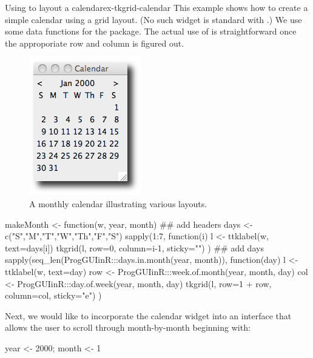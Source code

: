 \begin{example}{Using  to layout a calendar}{ex-tkgrid-calendar}
This example shows how to create a simple calendar using a grid
layout. (No such widget is standard with .) We use some
data functions for the  package. The actual use of
 is straightforward once the approporiate row and
column is figured out.




\begin{figure}
  \centering
  \includegraphics[width=.35\textwidth]{fig-tcltk-grid-calendar}
  \caption{A monthly calendar illustrating various layouts.}
  \label{fig:qt-gridlayout-calendar}
\end{figure}


\begin{Schunk}
\begin{Sinput}
 makeMonth <- function(w, year, month) {
   ## add headers
   days <- c("S","M","T","W","Th","F","S")
   sapply(1:7, function(i) {
     l <- ttklabel(w, text=days[i])       
     tkgrid(l, row=0, column=i-1, sticky="")
   })
   ## add days
   sapply(seq_len(ProgGUIinR:::days.in.month(year, month)), 
          function(day) {
            l <- ttklabel(w, text=day)
            row <- ProgGUIinR:::week.of.month(year, month, day)
            col <- ProgGUIinR:::day.of.week(year, month, day)
            tkgrid(l, row=1 + row, column=col, sticky="e")
          })
 }
\end{Sinput}
\end{Schunk}

Next, we would like to incorporate the calendar widget into an interface
that allows the user to scroll through month-by-month beginning with:
\begin{Schunk}
\begin{Sinput}
 year <- 2000; month <- 1
\end{Sinput}
\end{Schunk}


\end{example}
